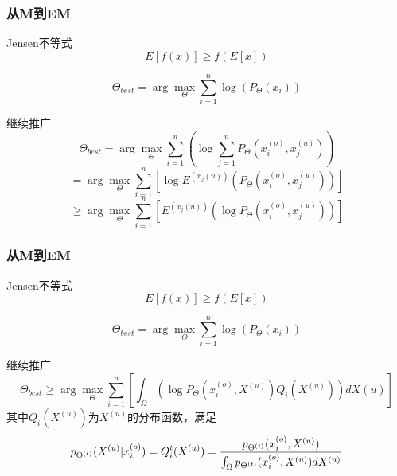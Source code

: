\documentclass[notheorems, UTF8]{ctexbeamer}
\begin{document}
\begin{frame}
\frametitle{从M到EM}
Jensen不等式\\
\begin{displaymath}
E[f(x)] \geq f(E[x])
\end{displaymath}


\begin{displaymath}
\Theta_{best} = \arg \max_{\Theta} \sum_{i = 1}^{n} \log\left(  P_{\Theta}(x_i)\right)
\end{displaymath}

继续推广
\begin{displaymath}
\Theta_{best} = \arg \max_{\Theta} \sum_{i = 1}^{n} \left( \log \sum_{j = 1}^{n} P_{\Theta}(x_i^{(o)}, x_j^{(u)}) \right)\end{displaymath}
\begin{displaymath} 
= \arg \max_{\Theta} \sum_{i = 1}^{n} \left[ \log E^{(x_j{(u)})}\left( P_{\Theta}(x_i^{(o)}, x_j^{(u)}) \right)\right]
\end{displaymath}
\begin{displaymath}
\geq \arg \max_{\Theta} \sum_{i = 1}^{n} \left[ E^{(x_j{(u)})}\left( \log P_{\Theta}(x_i^{(o)}, x_j^{(u)}) \right)\right] 
\end{displaymath}
\end{frame}



\begin{frame}
\frametitle{从M到EM}
Jensen不等式\\
\begin{displaymath}
E[f(x)] \geq f(E[x])
\end{displaymath}


\begin{displaymath}
\Theta_{best} = \arg \max_{\Theta} \sum_{i = 1}^{n} \log\left(  P_{\Theta}(x_i)\right)
\end{displaymath}

继续推广
\begin{displaymath}
\Theta_{best} \geq \arg \max_{\Theta} \sum_{i = 1}^{n} \left[ \int_{\Omega}\left( \log P_{\Theta}(x_i^{(o)}, X^{(u)}) Q_i(X^{(u)}) \right) d X{(u)} \right] 
\end{displaymath}
其中$Q_i(X^{(u)})$为$X^{(u)}$的分布函数，满足
\begin{displaymath}
p_{\Theta^{(t)}}(X^{(u)} | x_i^{(o)}) = Q_i^t(X^{(u)}) = {p_{\Theta^{(t)}}(x_i^{(o)}, X^{(u)}) \over \int_{\Omega}p_{\Theta^{(t)}}(x_i^{(o)}, X^{(u)}) d X^{(u)}}
\end{displaymath} 
\end{frame}
\end{document}
